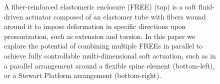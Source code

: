 \begin{figure}
\begin{tikzpicture}

\end{tikzpicture}

\caption{A fiber-reinforced elastomeric enclosure (FREE) (top) is a soft fluid-driven actuator composed of an elastomer tube with fibers wound around it to impose deformation in specific directions upon pressurization, such as extension and torsion. In this paper we explore the potential of combining multiple FREEs in parallel to achieve fully controllable multi-dimensional soft actuation, such as in a parallel arrangement around a flexible spine element (bottom-left), or a Stewart Platform arrangement (bottom-right).}
\label{fig:overview}
\end{figure}




%
%
